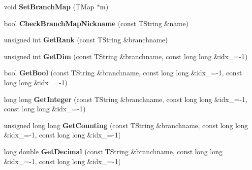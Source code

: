 \begin{DoxyCompactItemize}
\item 
\hypertarget{class_h_a_l_1_1_analysis_tree_reader_ae3dcc57b2cc27431e89edd341b300eb6}{void {\bfseries Set\+Branch\+Map} (T\+Map $\ast$m)}\label{class_h_a_l_1_1_analysis_tree_reader_ae3dcc57b2cc27431e89edd341b300eb6}

\item 
\hypertarget{class_h_a_l_1_1_analysis_tree_reader_afa371719adcfa583fe29ea0f468b9ea8}{bool {\bfseries Check\+Branch\+Map\+Nickname} (const T\+String \&name)}\label{class_h_a_l_1_1_analysis_tree_reader_afa371719adcfa583fe29ea0f468b9ea8}

\item 
\hypertarget{class_h_a_l_1_1_analysis_tree_reader_aa4dae5db1c660155760ded68007cdd6d}{unsigned int {\bfseries Get\+Rank} (const T\+String \&branchname)}\label{class_h_a_l_1_1_analysis_tree_reader_aa4dae5db1c660155760ded68007cdd6d}

\item 
\hypertarget{class_h_a_l_1_1_analysis_tree_reader_a1a8c741c6b2ae788b98d596c12543724}{unsigned int {\bfseries Get\+Dim} (const T\+String \&branchname, const long long \&idx\+\_=-\/1)}\label{class_h_a_l_1_1_analysis_tree_reader_a1a8c741c6b2ae788b98d596c12543724}

\item 
\hypertarget{class_h_a_l_1_1_analysis_tree_reader_a8a76466f4746d4764b0fa97416182267}{bool {\bfseries Get\+Bool} (const T\+String \&branchname, const long long \&idx\+\_=-\/1, const long long \&idx\+\_=-\/1)}\label{class_h_a_l_1_1_analysis_tree_reader_a8a76466f4746d4764b0fa97416182267}

\item 
\hypertarget{class_h_a_l_1_1_analysis_tree_reader_a6b2e01f1075ed295513a268258d3d559}{long long {\bfseries Get\+Integer} (const T\+String \&branchname, const long long \&idx\+\_=-\/1, const long long \&idx\+\_=-\/1)}\label{class_h_a_l_1_1_analysis_tree_reader_a6b2e01f1075ed295513a268258d3d559}

\item 
\hypertarget{class_h_a_l_1_1_analysis_tree_reader_aa4d264484021ba0912f6254aeacc784f}{unsigned long long {\bfseries Get\+Counting} (const T\+String \&branchname, const long long \&idx\+\_=-\/1, const long long \&idx\+\_=-\/1)}\label{class_h_a_l_1_1_analysis_tree_reader_aa4d264484021ba0912f6254aeacc784f}

\item 
\hypertarget{class_h_a_l_1_1_analysis_tree_reader_a4a3dd2065768228ab817575307c4691e}{long double {\bfseries Get\+Decimal} (const T\+String \&branchname, const long long \&idx\+\_=-\/1, const long long \&idx\+\_=-\/1)}\label{class_h_a_l_1_1_analysis_tree_reader_a4a3dd2065768228ab817575307c4691e}


\end{DoxyCompactItemize}
